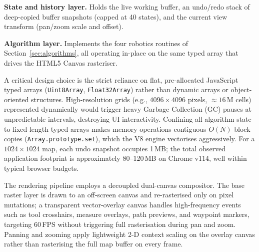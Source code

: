 \documentclass[journal]{IEEEtran}
\begin{document}
\textbf{State and history layer.}  Holds the live working buffer, an undo/redo
stack of deep-copied buffer snapshots (capped at 40 states), and the current
view transform (pan/zoom scale and offset).

\textbf{Algorithm layer.}  Implements the four robotics routines of
Section~\ref{sec:algorithms}, all operating in-place on the same typed array
that drives the HTML5 Canvas rasteriser.

A critical design choice is the strict reliance on flat, pre-allocated
JavaScript typed arrays (\texttt{Uint8Array}, \texttt{Float32Array}) rather
than dynamic arrays or object-oriented structures.  High-resolution grids
(e.g., $4096\times4096$ pixels, $\approx\!16$\,M cells) represented
dynamically would trigger heavy Garbage Collection (GC) pauses at unpredictable
intervals, destroying UI interactivity.  Confining all algorithm state to
fixed-length typed arrays makes memory operations contiguous $O(N)$ block
copies (\texttt{Array.prototype.set}), which the V8 engine vectorises
aggressively.  For a $1024\times1024$ map, each undo snapshot occupies 1\,MB;
the total observed application footprint is approximately 80--120\,MB on
Chrome v114, well within typical browser budgets.

The rendering pipeline employs a decoupled dual-canvas compositor.  The base
raster layer is drawn to an off-screen canvas and re-rasterised only on pixel
mutations; a transparent vector-overlay canvas handles high-frequency events
such as tool crosshairs, measure overlays, path previews, and waypoint
markers, targeting 60\,FPS without triggering full rasterisation during pan
and zoom.  Panning and zooming apply lightweight 2-D context scaling on the
overlay canvas rather than rasterising the full map buffer on every frame.
\end{document}
